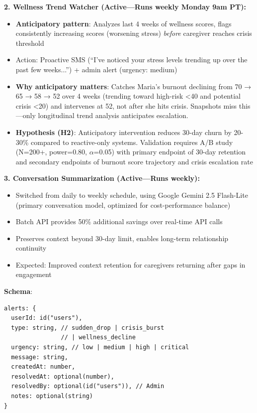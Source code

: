 \documentclass{article}
\begin{document}
\textbf{2. Wellness Trend Watcher (Active—Runs weekly Monday 9am PT):}
\begin{itemize}
    \item \textbf{Anticipatory pattern}: Analyzes last 4 weeks of wellness scores, flags consistently increasing scores (worsening stress) \textit{before} caregiver reaches crisis threshold
    \item Action: Proactive SMS (``I've noticed your stress levels trending up over the past few weeks...'') + admin alert (urgency: medium)
    \item \textbf{Why anticipatory matters}: Catches Maria's burnout declining from 70 → 65 → 58 → 52 over 4 weeks (trending toward high-risk <40 and potential crisis <20) and intervenes at 52, not after she hits crisis. Snapshots miss this—only longitudinal trend analysis anticipates escalation.
    \item \textbf{Hypothesis (H2)}: Anticipatory intervention reduces 30-day churn by 20-30\% compared to reactive-only systems. Validation requires A/B study (N=200+, power=0.80, $\alpha$=0.05) with primary endpoint of 30-day retention and secondary endpoints of burnout score trajectory and crisis escalation rate
\end{itemize}

\textbf{3. Conversation Summarization (Active—Runs weekly):}
\begin{itemize}
    \item Switched from daily to weekly schedule, using Google Gemini 2.5 Flash-Lite (primary conversation model, optimized for cost-performance balance)
    \item Batch API provides 50\% additional savings over real-time API calls
    \item Preserves context beyond 30-day limit, enables long-term relationship continuity
    \item Expected: Improved context retention for caregivers returning after gaps in engagement
\end{itemize}

\textbf{Schema}:
\begin{verbatim}
alerts: {
  userId: id("users"),
  type: string, // sudden_drop | crisis_burst
                // | wellness_decline
  urgency: string, // low | medium | high | critical
  message: string,
  createdAt: number,
  resolvedAt: optional(number),
  resolvedBy: optional(id("users")), // Admin
  notes: optional(string)
}
\end{verbatim}
\end{document}
